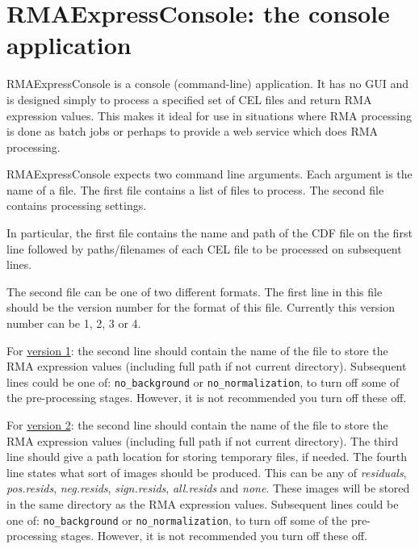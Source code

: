 \documentclass[11pt]{report}
\begin{document}
\chapter{RMAExpressConsole: the console application} \label{chap:RMAExpressConsole}

RMAExpressConsole is a console (command-line) application. It has no GUI and is designed simply to process a specified set of CEL files and return RMA expression values. This makes it ideal for use in situations where RMA processing is done as batch jobs or perhaps to provide a web service which does RMA processing.

RMAExpressConsole expects two command line arguments. Each argument is the name of a file. The first file contains a list of files to process. The second file contains processing settings.

In particular, the first file contains the name and path of the CDF file on the first line followed by paths/filenames of each CEL file to be processed on subsequent lines.

The second file can be one of two different formats. The first line in this file should be the version number for the format of this file. Currently this version number can be 1, 2, 3 or 4. 

For \underline{version 1}: the second line should contain the name of the file to store the RMA expression values (including full path if not current directory). Subsequent lines could be one of: {\tt no\_background} or {\tt no\_normalization}, to turn off some of the pre-processing stages. However, it is not recommended you turn off these off.

For \underline{version 2}: the second line should contain the name of the file to store the RMA expression values (including full path if not current directory). The third line should give a path location for storing temporary files, if needed. The fourth line states what sort of images should be produced. This can be any of {\it residuals},  {\it pos.resids}, {\it neg.resids}, {\it sign.resids}, {\it all.resids} and {\it none}. These images will be stored in the same directory as the RMA expression values. Subsequent lines could be one of: {\tt no\_background} or {\tt no\_normalization}, to turn off some of the pre-processing stages. However, it is not recommended you turn off these off.
\end{document}
